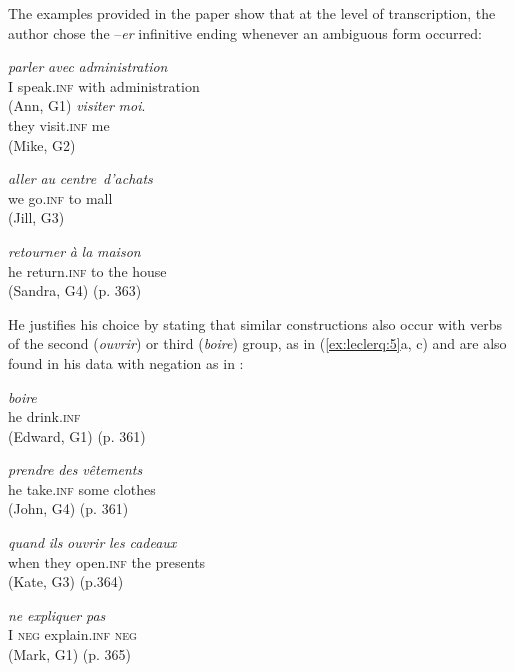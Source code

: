 \documentclass[output=paper,colorlinks,citecolor=brown,modfonts,nonflat]{../langscibook}
\begin{document}
The examples provided in the paper show that at the level of transcription, the author chose the –\textit{er} infinitive ending whenever an ambiguous form occurred:

\ea%
    \label{ex:leclerq:4}
\ea {} {\textit{parler}} {\textit{avec}} {\textit{administration}}\\
    I speak.\textsc{inf} with administration\\
    (Ann, G1)
\ex
{} {\textit{visiter}} {\textit{moi}.}\\
    they visit.\textsc{inf} me\\
    (Mike, G2)

\ex
{} {\textit{aller}} {\textit{au}} {\textit{centre}}~{\textit{d’}\textit{achats}}\\
    we go.\textsc{inf} to mall\\
    (Jill, G3)

\ex
{} {\textit{retourner}} {\textit{à}} {\textit{la}} {\textit{maison}}\\
    he return.\textsc{inf} to the house\\
    (Sandra, G4) (p. 363)
\z
\z

He justifies his choice by stating that similar constructions also occur with verbs of the second (\textit{ouvrir}) or third (\textit{boire}) group, as in (\ref{ex:leclerq:5}a, c) and are also found in his data with negation as in :

\ea
 \label{ex:leclerq:5}
 \ea
  {\textit{boire}}\\
          he drink.\textsc{inf}\\
          (Edward, G1) (p. 361)

\ex
{} {\textit{prendre}} {\textit{des}} {\textit{vêtements}}\\
    he take.\textsc{inf} some clothes\\
    (John, G4) (p. 361)

\ex
{} {\textit{quand}} {\textit{ils}} {\textit{ouvrir}} {\textit{les}} {\textit{cadeaux}}\\
      {}  when they open.\textsc{inf} the presents\\
        (Kate, G3) (p.364)
\z
\z

\ea%
    \label{ex:leclerq:6}
          {\textit{ne}} {\textit{expliquer}} {\textit{pas}} \\
        I \textsc{neg} explain.\textsc{inf} \textsc{neg}\\
        (Mark, G1) (p. 365)
\z
\end{document}
